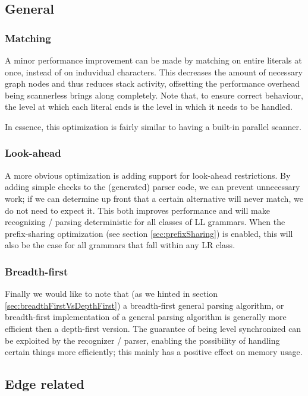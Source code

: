\documentclass[a4paper,10pt]{article}
\begin{document}
\subsection{General}

\subsubsection{Matching}
A minor performance improvement can be made by matching on entire literals at once, instead of on induvidual characters. This decreases the amount of necessary graph nodes and thus reduces stack activity, offsetting the performance overhead being scannerless brings along completely. Note that, to ensure correct behaviour, the level at which each literal ends is the level in which it needs to be handled.

In essence, this optimization is fairly similar to having a built-in parallel scanner.

\subsubsection{Look-ahead}
A more obvious optimization is adding support for look-ahead restrictions. By adding simple checks to the (generated) parser code, we can prevent unnecessary work; if we can determine up front that a certain alternative will never match, we do not need to expect it. This both improves performance and will make recognizing / parsing deterministic for all classes of LL grammars. When the prefix-sharing optimization (see section \ref{sec:prefixSharing}) is enabled, this will also be the case for all grammars that fall within any LR class.

\subsubsection{Breadth-first}
Finally we would like to note that (as we hinted in section \ref{sec:breadthFirstVsDepthFirst}) a breadth-first general parsing algorithm, or breadth-first implementation of a general parsing algorithm is generally more efficient then a depth-first version. The guarantee of being level synchronized can be exploited by the recognizer / parser, enabling the possibility of handling certain things more efficiently; this mainly has a positive effect on memory usage.

\subsection{Edge related}
\label{sec:edgeOptimizations}
\end{document}
